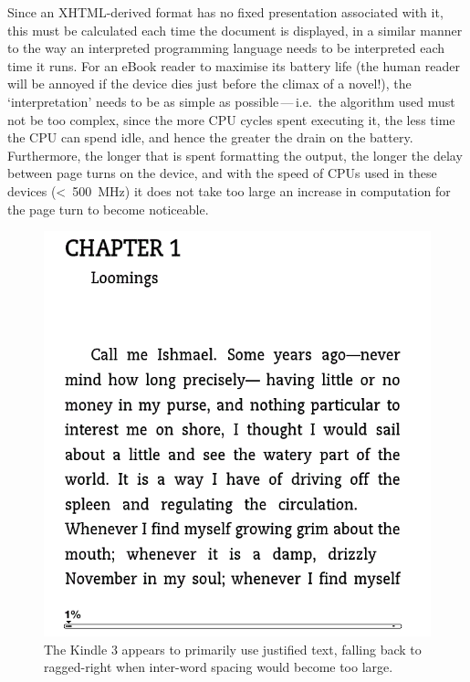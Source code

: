 Since an XHTML-derived format has no fixed presentation associated with it, this must be calculated
each time the document is displayed, in a similar manner to the way an interpreted programming
language needs to be interpreted each time it runs. For an eBook reader to maximise its battery life
(the human reader will be annoyed if the device dies just before the climax of a novel!), the
`interpretation' needs to be as simple as possible\,---\,i.e.~the algorithm used must not be too
complex, since the more CPU cycles spent executing it, the less time the CPU can spend idle, and
hence the greater the drain on the battery. Furthermore, the longer that is spent formatting the
output, the longer the delay between page turns on the device, and with the speed of CPUs used in
these devices (<~500~MHz) it does not take too large an increase in computation for the page turn to
become noticeable.

\begin{figure}
    \centering
    \includegraphics[width=\textwidth]{gfx/screen_shot-42583}
    \caption[An example of typesetting on the Kindle]{The Kindle 3 appears to primarily use
justified text, falling back to ragged-right when
inter-word spacing would become too large.}
    \label{kindle}
\end{figure}


